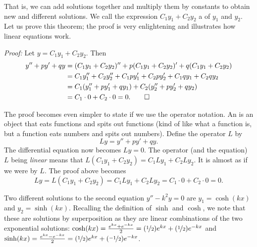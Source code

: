 That is, we can add solutions together and multiply them by constants to
obtain new and different solutions.  We call
the expression $C_1 y_1 + C_2 y_2$ a
\emph{} of $y_1$ and $y_2$.
Let us
prove this theorem; the
proof is very enlightening and illustrates how linear equations work.

\medskip

\emph{Proof:}
Let 
$y = C_1 y_1 + C_2 y_2$.  Then
\begin{equation*}
\begin{split}
y'' + py' + qy & =
(C_1 y_1 + C_2 y_2)'' + p(C_1 y_1 + C_2 y_2)' + q(C_1 y_1 + C_2 y_2) \\
& = C_1 y_1'' + C_2 y_2'' + C_1 p y_1' + C_2 p y_2' + C_1 q y_1 + C_2 q y_2 \\
& = C_1 ( y_1'' + p y_1' + q y_1 ) + C_2 ( y_2'' + p y_2' + q y_2 ) \\
& = C_1 \cdot 0 + C_2 \cdot 0 = 0 . \qed
\end{split}
\end{equation*}

\medskip

The proof becomes even simpler to state if we use the
operator notation.
An \emph{} is an object that eats functions and spits out functions (kind of
like what a function is, but a function eats numbers and spits out numbers).
Define the operator $L$ by
\begin{equation*}
Ly = y'' + py' + qy .
\end{equation*}
The differential equation now becomes $Ly=0$.
The operator (and the equation)
$L$ being \emph{linear} means that $L(C_1y_1 + C_2y_2) = 
C_1 Ly_1 + C_2 Ly_2$.  It is almost as if we were  by $L$.  The proof above becomes
\begin{equation*}
Ly = L(C_1y_1 + C_2y_2) = 
C_1 Ly_1 + C_2 Ly_2 = C_1 \cdot 0 + C_2 \cdot 0 = 0 .
\end{equation*}

\medskip

Two different solutions to the second equation $y'' - k^2y = 0$ are
$y_1 = \cosh (kx)$ and $y_2 = \sinh (kx)$.
Recalling the definition of $\sinh$ and $\cosh$,
we note that these are solutions by
superposition as they
are linear combinations of the two
exponential solutions:
$\cosh(kx) = \frac{e^{kx}  + e^{-kx}}{2} = (\nicefrac{1}{2}) e^{kx}  +
(\nicefrac{1}{2}) e^{-kx}$ and
$\sinh(kx) = \frac{e^{kx} - e^{-kx}}{2} = (\nicefrac{1}{2}) e^{kx}  +
(\nicefrac{-1}{2}) e^{-kx}$.

